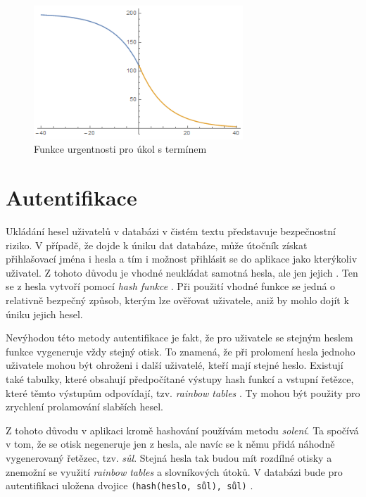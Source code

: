 \documentclass[thesis=B,czech]{FITthesis}[2012/06/26]
\begin{document}
			\begin{figure}\centering
				\includegraphics[width=0.7\textwidth]{resources/urgency-plot.png}
				\caption[Urgentnost úkolu s termínem]{Funkce urgentnosti pro úkol s termínem}
				\label{urgency-plot}
			\end{figure}
			


	
	\section{Autentifikace}
		Ukládání hesel uživatelů v databázi v čistém textu představuje bezpečnostní riziko. V případě, že dojde k úniku dat databáze, může útočník získat přihlašovací jména i hesla a tím i možnost přihlásit se do aplikace jako kterýkoliv uživatel. Z tohoto důvodu je vhodné neukládat samotná hesla, ale jen jejich . Ten se z hesla vytvoří pomocí \textit{hash funkce} \cite{hash-function}. Při použití vhodné funkce se jedná o relativně bezpečný způsob, kterým lze ověřovat uživatele, aniž by mohlo dojít k úniku jejich hesel.
		
		Nevýhodou této metody autentifikace je fakt, že pro uživatele se stejným heslem funkce vygeneruje vždy stejný otisk. To znamená, že při prolomení hesla jednoho uživatele mohou být ohroženi i další uživatelé, kteří mají stejné heslo. Existují také tabulky, které obsahují předpočítané výstupy hash funkcí a vstupní řetězce, které těmto výstupům odpovídají, tzv. \textit{rainbow tables} \cite{rainbow-table}. Ty mohou být použity pro zrychlení prolamování slabších hesel. 
		
		Z tohoto důvodu v aplikaci kromě hashování používám metodu \textit{solení}. Ta spočívá v tom, že se otisk negeneruje jen z hesla, ale navíc se k němu přidá náhodně vygenerovaný řetězec, tzv. \textit{sůl}. Stejná hesla tak budou mít rozdílné otisky a znemožní se využití \textit{rainbow tables} a slovníkových útoků. V databázi bude pro autentifikaci uložena dvojice \texttt{(hash(heslo, sůl), sůl)} \cite{hash-function}.
				
\end{document}

